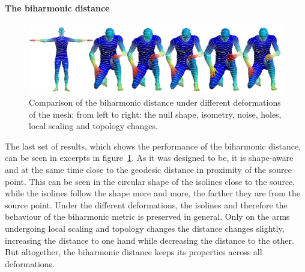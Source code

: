 \paragraph{The biharmonic distance}
\begin{figure}[h]
	\centering
	\includegraphics[width = \textwidth]{../results/biharmonic_isolines}
	\caption{Comparison of the biharmonic distance under different deformations of the mesh; from left to right: the null shape, isometry, noise, holes, local scaling and topology changes.}
	\label{fig:biharmonic_isolines}
\end{figure}
The last set of results, which shows the performance of the biharmonic distance, can be seen in excerpts in figure~\ref{fig:biharmonic_isolines}.
As it was designed to be, it is shape-aware and at the same time close to the geodesic distance in proximity of the source point.
This can be seen in the circular shape of the isolines close to the source, while the isolines follow the shape more and more, the farther they are from the source point.
Under the different deformations, the isolines and therefore the behaviour of the biharmonic metric is preserved in general.
Only on the arms undergoing  local scaling and topology changes the distance changes slightly, increasing the distance to one hand while decreasing the distance to the other.
But altogether, the biharmonic distance keeps its properties across all deformations.

